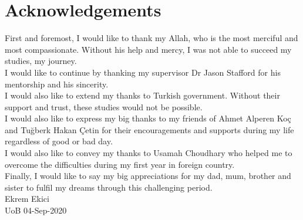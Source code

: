 \cleardoublepage
{}
\section*{Acknowledgements}

 First and foremost, I would like to thank my Allah, who is the most merciful and most compassionate. Without his help and mercy, I was not able to succeed my studies, my journey.\\

 \noindent I would like to continue by thanking my supervisor Dr Jason Stafford for his mentorship and his sincerity.\\
 
 \noindent I would also like to extend my thanks to Turkish government. Without their support and trust, these studies would not be possible. 	\\
 
 \noindent I would also like to express my big thanks to my friends of Ahmet Alperen Koç and Tuğberk Hakan Çetin for their encouragements and supports during my life regardless of good or bad day.\\
 
 \noindent I would also like to convey my thanks to Usamah Choudhary who helped me to overcome the difficulties during my first year in foreign country.\\
 
 \noindent Finally, I would like to say my big appreciations for my dad, mum, brother and sister to fulfil my dreams through this challenging period.\\
 
 \noindent Ekrem Ekici\\
 
 \noindent UoB 04-Sep-2020\\
 \afterpage{\blankpage}